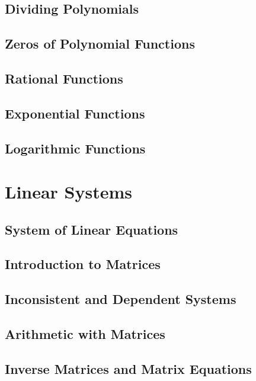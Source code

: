 \documentclass[oneside]{scrbook}
\begin{document}
\chapter{Dividing Polynomials}
\chapter{Zeros of Polynomial Functions}
\chapter{Rational Functions}
\chapter{Exponential Functions}
\chapter{Logarithmic Functions}

\part{Linear Systems}
\chapter{System of Linear Equations}
\chapter{Introduction to Matrices}
\chapter{Inconsistent and Dependent Systems}
\chapter{Arithmetic with Matrices}
\chapter{Inverse Matrices and Matrix Equations}

\end{document}
